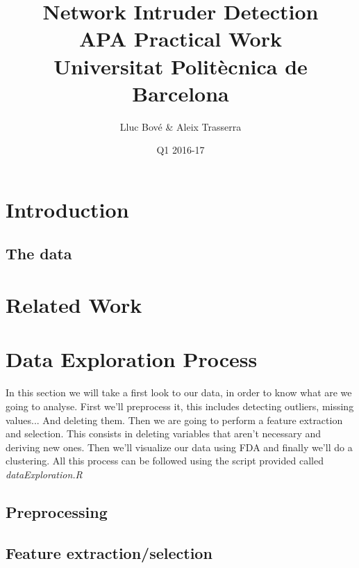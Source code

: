 \documentclass[a4paper]{article} %
\title{Network Intruder Detection \\
\large APA Practical Work \\
Universitat Politècnica de Barcelona} %
\author{Lluc Bové \& Aleix Trasserra} %
\date{Q1 2016-17}
\begin{document}
\maketitle %



\section{Introduction}
\subsection{The data}

\section{Related Work}


\section{Data Exploration Process}
In this section we will take a first look to our data, in order to know what are we going to analyse. First we'll preprocess it, this includes detecting outliers, missing values... And deleting them. Then we are going to perform a feature extraction and selection. This consists in deleting variables that aren't necessary and deriving new ones. Then we'll visualize our data using FDA and finally we'll do a clustering. All this process can be followed using the script provided called \textit{dataExploration.R}
\subsection{Preprocessing}
\subsection{Feature extraction/selection}
\end{document}
